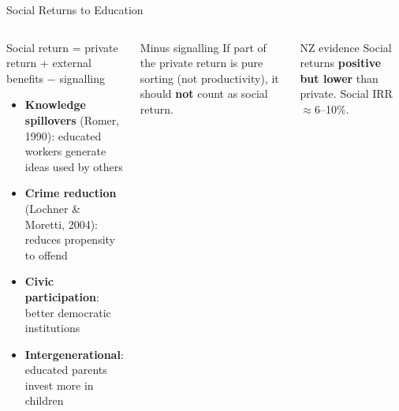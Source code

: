 \documentclass[aspectratio=169, 12pt]{beamer}
\begin{document}
\begin{frame}{Social Returns to Education}
  \begin{columns}
      \begin{block}{Social return = private return + external benefits $-$ signalling}
        \scriptsize
        \begin{itemize}
          \item \textbf{Knowledge spillovers} (Romer, 1990): educated workers generate ideas used by others
          \item \textbf{Crime reduction} (Lochner \& Moretti, 2004): reduces propensity to offend
          \item \textbf{Civic participation}: better democratic institutions
          \item \textbf{Intergenerational}: educated parents invest more in children
        \end{itemize}
      \end{block}
      \begin{alertblock}{Minus signalling}
        \footnotesize If part of the private return is pure sorting (not productivity), it should \textbf{not} count as social return.
      \end{alertblock}
      \begin{exampleblock}{NZ evidence}
        \footnotesize Social returns \textbf{positive but lower} than private. Social IRR $\approx$6--10\%.
      \end{exampleblock}
  \end{columns}
\end{frame}
\end{document}
